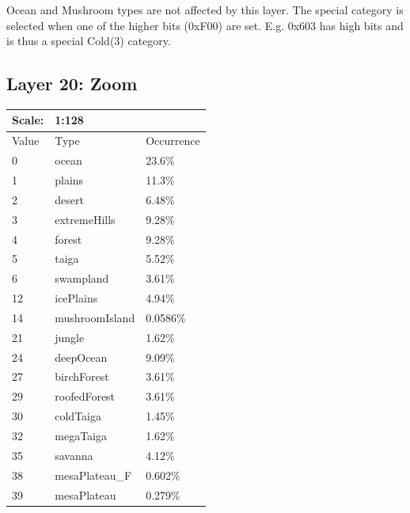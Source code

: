 \documentclass{article}
\begin{document}
	\medskip\noindent
	Ocean and Mushroom types are not affected by this layer. The special category is selected when one of the higher bits (0xF00) are set. E.g. 0x603 has high bits and is thus a special Cold(3) category.


	\subsection{Layer 20: Zoom}
	\begin{tabular}{|l|l|l|}\hline
		Scale: & \multicolumn{2}{|l|}{1:128} \\\hline\hline
		Value  & Type           & Occurrence \\\hline
		0      & ocean          & 23.6\%\\\hline
		1      & plains         & 11.3\%\\\hline
		2      & desert         & 6.48\%\\\hline
		3      & extremeHills   & 9.28\%\\\hline
		4      & forest         & 9.28\%\\\hline
		5      & taiga          & 5.52\%\\\hline
		6      & swampland      & 3.61\%\\\hline
		12     & icePlains      & 4.94\%\\\hline
		14     & mushroomIsland & 0.0586\%\\\hline
		21     & jungle         & 1.62\%\\\hline
		24     & deepOcean      & 9.09\%\\\hline
		27     & birchForest    & 3.61\%\\\hline
		29     & roofedForest   & 3.61\%\\\hline
		30     & coldTaiga      & 1.45\%\\\hline
		32     & megaTaiga      & 1.62\%\\\hline
		35     & savanna        & 4.12\%\\\hline
		38     & mesaPlateau\_F & 0.602\%\\\hline
		39     & mesaPlateau    & 0.279\%\\\hline
	\end{tabular}
\end{document}
